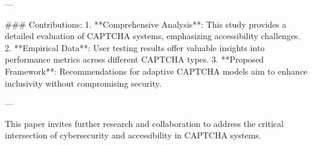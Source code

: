 ---

### Contributions:
1. **Comprehensive Analysis**: This study provides a detailed evaluation of CAPTCHA systems, emphasizing accessibility challenges.
2. **Empirical Data**: User testing results offer valuable insights into performance metrics across different CAPTCHA types.
3. **Proposed Framework**: Recommendations for adaptive CAPTCHA models aim to enhance inclusivity without compromising security.

---

This paper invites further research and collaboration to address the critical intersection of cybersecurity and accessibility in CAPTCHA systems.
